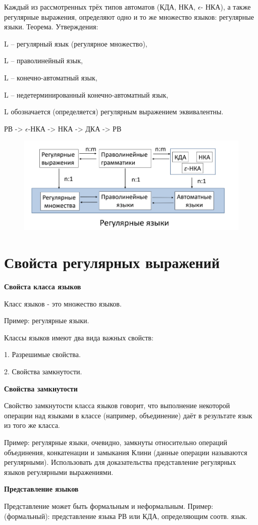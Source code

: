 \documentclass{article}
\begin{document}
 Каждый из рассмотренных трёх типов автоматов (КДА, НКА, $\epsilon$-
НКА), а также регулярные выражения, определяют одно и то же
множество языков: регулярные языки.
Теорема. Утверждения:

 L – регулярный язык (регулярное множество),

 L – праволинейный язык,

 L – конечно-автоматный язык,

 L – недетерминированный конечно-автоматный язык,

 L обозначается (определяется) регулярным выражением
эквивалентны.

РВ -> $\epsilon$-НКА -> НКА -> ДКА -> РВ

\begin{figure}[H]
    \centering
    \includegraphics[width=0.50\linewidth]{Снимок экрана 2025-03-20 093221.png}
\end{figure}

\section{Свойста регулярных выражений}
\textbf{Свойста класса языков}

Класс языков - это множество языков.

Пример: регулярные языки.

Классы языков имеют два вида важных свойств:

1. Разрешимые свойства.

2. Свойства замкнутости.

\textbf{Свойства замкнутости}

Свойство замкнутости класса языков говорит, что выполнение
некоторой операции над языками в классе (например,
объединение) даёт в результате язык из того же класса.

Пример: регулярные языки, очевидно, замкнуты относительно
операций объединения, конкатенации и замыкания Клини
(данные операции называются регулярными).
Использовать для доказательства представление регулярных языков
регулярными выражениями.

\textbf{Представление языков}

Представление может быть формальным и неформальным.
Пример: (формальный): представление языка РВ или КДА,
определяющим соотв. язык.
\end{document}
